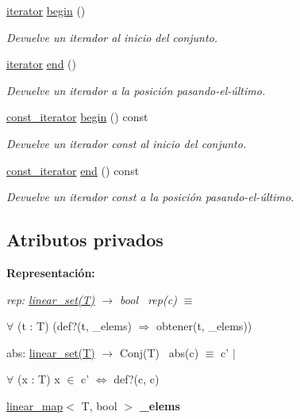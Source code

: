 \begin{DoxyCompactItemize}
\item 
\hyperlink{classlinear__set_1_1iterator}{iterator} \hyperlink{classlinear__set_a80bad302b65a43aba2a0fbf5e4637a59}{begin} ()
\begin{DoxyCompactList}\small\item\em Devuelve un iterador al inicio del conjunto. \end{DoxyCompactList}\item 
\hyperlink{classlinear__set_1_1iterator}{iterator} \hyperlink{classlinear__set_aa16e2607ba7bc80c86eda9f2301d194d}{end} ()
\begin{DoxyCompactList}\small\item\em Devuelve un iterador a la posición pasando-\/el-\/último. \end{DoxyCompactList}\item 
\hyperlink{classlinear__set_1_1const__iterator}{const\+\_\+iterator} \hyperlink{classlinear__set_a618bae1c12e9bb0aa0f4f878dbafbdb5}{begin} () const 
\begin{DoxyCompactList}\small\item\em Devuelve un iterador const al inicio del conjunto. \end{DoxyCompactList}\item 
\hyperlink{classlinear__set_1_1const__iterator}{const\+\_\+iterator} \hyperlink{classlinear__set_a9cbffd97e4a2d8d89afdf81fab83dbaa}{end} () const 
\begin{DoxyCompactList}\small\item\em Devuelve un iterador const a la posición pasando-\/el-\/último. \end{DoxyCompactList}\end{DoxyCompactItemize}
\subsection*{Atributos privados}
\begin{Indent}{\bf Representación\+:}\par
{\em rep\+: \hyperlink{classlinear__set}{linear\+\_\+set(\+T)} $\to$ bool~\newline
rep(c) $\equiv$
\begin{DoxyItemize}
\item $\forall$ (t \+: T) (def?(t, \+\_\+elems) $\Rightarrow$ obtener(t, \+\_\+elems))
\end{DoxyItemize}

abs\+: \hyperlink{classlinear__set}{linear\+\_\+set(\+T)} $\to$ Conj(\+T)~\newline
abs(c) $\equiv$ c' $|$
\begin{DoxyItemize}
\item $\forall$ (x \+: T) x $\in$ c' $\Leftrightarrow$ def?(c, c) 
\end{DoxyItemize}}\begin{DoxyCompactItemize}
\item 
\hypertarget{classlinear__set_ab9ee1d2a9a2b2786152f68bd0039d201}{\hyperlink{classlinear__map}{linear\+\_\+map}$<$ T, bool $>$ {\bfseries \+\_\+elems}}\label{classlinear__set_ab9ee1d2a9a2b2786152f68bd0039d201}

\end{DoxyCompactItemize}
\end{Indent}


